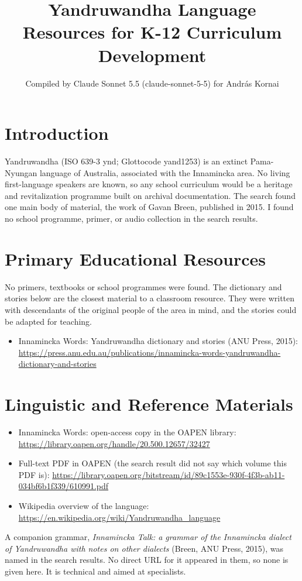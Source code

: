 \documentclass[12pt]{article}
\title{Yandruwandha Language Resources for K-12 Curriculum Development}
\author{Compiled by Claude Sonnet 5.5 (claude-sonnet-5-5) for Andr\'as Kornai}
\date{}
\begin{document}
\maketitle

\section{Introduction}
Yandruwandha (ISO 639-3 ynd; Glottocode yand1253) is an extinct Pama-Nyungan language of Australia, associated with the Innamincka area. No living first-language speakers are known, so any school curriculum would be a heritage and revitalization programme built on archival documentation. The search found one main body of material, the work of Gavan Breen, published in 2015. I found no school programme, primer, or audio collection in the search results.

\section{Primary Educational Resources}
No primers, textbooks or school programmes were found. The dictionary and stories below are the closest material to a classroom resource. They were written with descendants of the original people of the area in mind, and the stories could be adapted for teaching.
\begin{itemize}
\item Innamincka Words: Yandruwandha dictionary and stories (ANU Press, 2015): \url{https://press.anu.edu.au/publications/innamincka-words-yandruwandha-dictionary-and-stories}
\end{itemize}

\section{Linguistic and Reference Materials}
\begin{itemize}
\item Innamincka Words: open-access copy in the OAPEN library: \url{https://library.oapen.org/handle/20.500.12657/32427}
\item Full-text PDF in OAPEN (the search result did not say which volume this PDF is): \url{https://library.oapen.org/bitstream/id/89c1553e-930f-4f3b-ab11-034bf6b1f339/610991.pdf}
\item Wikipedia overview of the language: \url{https://en.wikipedia.org/wiki/Yandruwandha_language}
\end{itemize}
A companion grammar, \emph{Innamincka Talk: a grammar of the Innamincka dialect of Yandruwandha with notes on other dialects} (Breen, ANU Press, 2015), was named in the search results. No direct URL for it appeared in them, so none is given here. It is technical and aimed at specialists.
\end{document}
